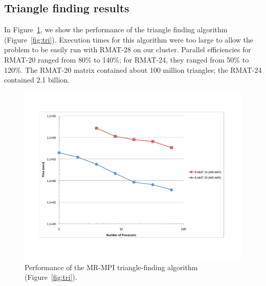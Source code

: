 %

\subsection{Triangle finding results}

In Figure~\ref{f:tri}, we show the performance of the triangle finding
algorithm (Figure~\ref{fig:tri}).  Execution times for this algorithm
were too large to allow the problem to be easily run with RMAT-28 on
our cluster.  Parallel efficiencies for RMAT-20 ranged from 80\% to
140\%; for RMAT-24, they ranged from 50\% to 120\%.  The RMAT-20
matrix contained about 100 million triangles; the RMAT-24 contained
2.1 billion.


\begin{figure}[htb]
\includegraphics[width=\textwidth]{fig_tri.pdf}
\caption{Performance of the MR-MPI triangle-finding algorithm
(Figure~\ref{fig:tri}).}
\label{f:tri}
\end{figure}

